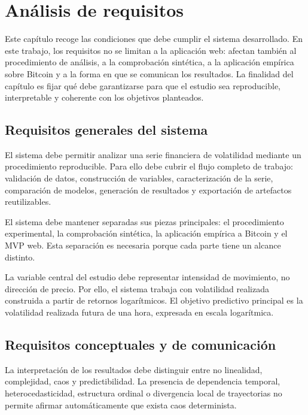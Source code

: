 
\chapter{Análisis de requisitos}\label{cap:requisitos}

Este capítulo recoge las condiciones que debe cumplir el sistema desarrollado. En este trabajo, los requisitos no se limitan a la aplicación web: afectan también al procedimiento de análisis, a la comprobación sintética, a la aplicación empírica sobre Bitcoin y a la forma en que se comunican los resultados. La finalidad del capítulo es fijar qué debe garantizarse para que el estudio sea reproducible, interpretable y coherente con los objetivos planteados.

\section{Requisitos generales del sistema}\label{sec:requisitos-generales}

El sistema debe permitir analizar una serie financiera de volatilidad mediante un procedimiento reproducible. Para ello debe cubrir el flujo completo de trabajo: validación de datos, construcción de variables, caracterización de la serie, comparación de modelos, generación de resultados y exportación de artefactos reutilizables.

El sistema debe mantener separadas sus piezas principales: el procedimiento experimental, la comprobación sintética, la aplicación empírica a Bitcoin y el MVP web. Esta separación es necesaria porque cada parte tiene un alcance distinto.

La variable central del estudio debe representar intensidad de movimiento, no dirección de precio. Por ello, el sistema trabaja con volatilidad realizada construida a partir de retornos logarítmicos. El objetivo predictivo principal es la volatilidad realizada futura de una hora, expresada en escala logarítmica.

\section{Requisitos conceptuales y de comunicación}\label{sec:requisitos-conceptuales}

La interpretación de los resultados debe distinguir entre no linealidad, complejidad, caos y predictibilidad. La presencia de dependencia temporal, heterocedasticidad, estructura ordinal o divergencia local de trayectorias no permite afirmar automáticamente que exista caos determinista.

